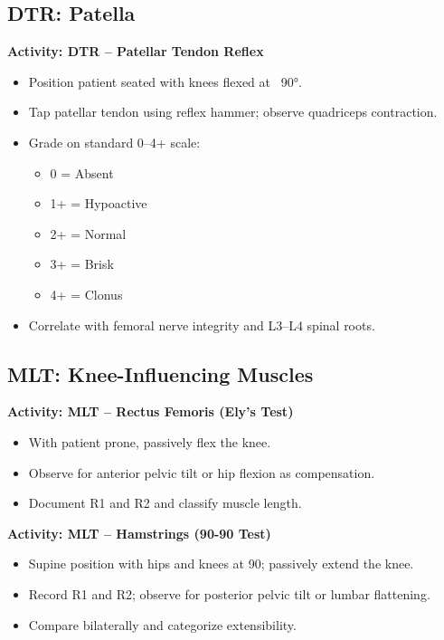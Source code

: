 \subsection*{DTR: Patella}

\begin{labactivitybox}
\textbf{Activity: DTR – Patellar Tendon Reflex}

\begin{itemize}
  \item Position patient seated with knees flexed at ~90°.
  \item Tap patellar tendon using reflex hammer; observe quadriceps contraction.
  \item Grade on standard 0–4+ scale:
    \begin{itemize}
      \item 0 = Absent
      \item 1+ = Hypoactive
      \item 2+ = Normal
      \item 3+ = Brisk
      \item 4+ = Clonus
    \end{itemize}
  \item Correlate with femoral nerve integrity and L3–L4 spinal roots.
\end{itemize}
\end{labactivitybox}

\subsection*{MLT: Knee-Influencing Muscles}

\begin{labactivitybox}
\textbf{Activity: MLT -- Rectus Femoris (Ely's Test)}
\begin{itemize}
  \item With patient prone, passively flex the knee.
  \item Observe for anterior pelvic tilt or hip flexion as compensation.
  \item Document R1 and R2 and classify muscle length.
\end{itemize}
\end{labactivitybox}

\begin{labactivitybox}
\textbf{Activity: MLT -- Hamstrings (90-90 Test)}
\begin{itemize}
  \item Supine position with hips and knees at 90\degree; passively extend the knee.
  \item Record R1 and R2; observe for posterior pelvic tilt or lumbar flattening.
  \item Compare bilaterally and categorize extensibility.
\end{itemize}
\end{labactivitybox}


